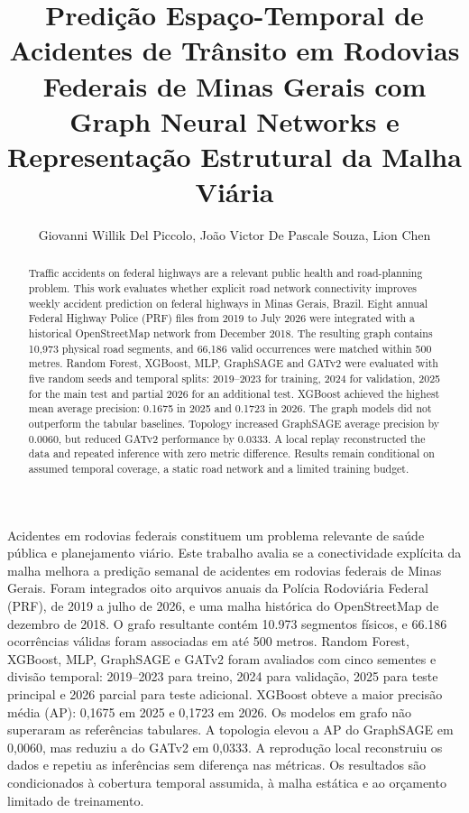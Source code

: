 \documentclass[12pt]{article}
\title{Predição Espaço-Temporal de Acidentes de Trânsito em Rodovias
Federais de Minas Gerais com Graph Neural Networks e Representação
Estrutural da Malha Viária}
\author{
Giovanni Willik Del Piccolo\inst{1},
João Victor De Pascale Souza\inst{2},
Lion Chen\inst{3}
}
\begin{document}
\maketitle

\begin{abstract}
Traffic accidents on federal highways are a relevant public health
and road-planning problem. This work evaluates whether explicit road
network connectivity improves weekly accident prediction on federal
highways in Minas Gerais, Brazil. Eight annual Federal Highway Police
(PRF) files from 2019 to July 2026 were integrated with a historical
OpenStreetMap network from December 2018. The resulting graph contains
10,973 physical road segments, and 66,186 valid occurrences were
matched within 500 metres. Random Forest, XGBoost, MLP, GraphSAGE and
GATv2 were evaluated with five random seeds and temporal splits:
2019--2023 for training, 2024 for validation, 2025 for the main test
and partial 2026 for an additional test. XGBoost achieved the highest
mean average precision: 0.1675 in 2025 and 0.1723 in 2026. The graph
models did not outperform the tabular baselines. Topology increased
GraphSAGE average precision by 0.0060, but reduced GATv2 performance by
0.0333. A local replay reconstructed the data and repeated inference
with zero metric difference. Results remain conditional on assumed
temporal coverage, a static road network and a limited training
budget.
\end{abstract}

\begin{resumo}
Acidentes em rodovias federais constituem um problema relevante de
saúde pública e planejamento viário. Este trabalho avalia se a
conectividade explícita da malha melhora a predição semanal de
acidentes em rodovias federais de Minas Gerais. Foram integrados oito
arquivos anuais da Polícia Rodoviária Federal (PRF), de 2019 a julho de
2026, e uma malha histórica do OpenStreetMap de dezembro de 2018. O
grafo resultante contém 10.973 segmentos físicos, e 66.186 ocorrências
válidas foram associadas em até 500 metros. Random Forest, XGBoost,
MLP, GraphSAGE e GATv2 foram avaliados com cinco sementes e divisão
temporal: 2019--2023 para treino, 2024 para validação, 2025 para teste
principal e 2026 parcial para teste adicional. XGBoost obteve a maior
precisão média (AP): 0,1675 em 2025 e 0,1723 em 2026. Os modelos em
grafo não superaram as referências tabulares. A topologia elevou a AP
do GraphSAGE em 0,0060, mas reduziu a do GATv2 em 0,0333. A reprodução
local reconstruiu os dados e repetiu as inferências sem diferença nas
métricas. Os resultados são condicionados à cobertura temporal
assumida, à malha estática e ao orçamento limitado de treinamento.
\end{resumo}
\end{document}
